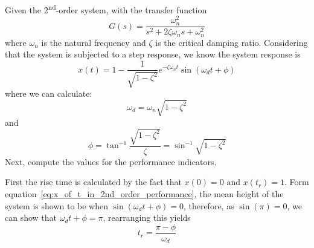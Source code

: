 \documentclass[12pt,letter]{article}
\begin{document}
Given the 2\textsuperscript{nd}-order system, with the transfer function
\begin{equation}
G(s) = \frac{\omega_n^2}{s^2 + 2 \zeta \omega_n s + \omega_n^2}
\end{equation}
where $\omega_n$ is the natural frequency and $\zeta$ is the critical damping ratio. Considering that the system is subjected to a step response, we know the system response is
\begin{equation}
x(t) = 1 - \frac{1}{\sqrt{1-\zeta^2}} e^{-\zeta \omega_n t} \sin (\omega_d t + \phi)
\label{eq:x_of_t_in_2nd_order_performance}
\end{equation}
where we can calculate:
\begin{equation}
\omega_d = \omega_n \sqrt{1-\zeta^2}
\end{equation}
and
\begin{equation}
\phi = \tan^{-1} \frac{\sqrt{1-\zeta^2}}{\zeta} = \sin^{-1} \sqrt{1-\zeta^2}
\label{eq:tan_in_performance_indicators}
\end{equation}
Next, compute the values for the performance indicators. 

First the rise time is calculated by the fact that $x(0) = 0$ and $x(t_r)=1$. Form equation~\ref{eq:x_of_t_in_2nd_order_performance}, the mean height of the system is shown to be when $ \sin (\omega_d t + \phi) = 0$, therefore, as $\sin(\pi)=0$, we can show that $\omega_d t + \phi = \pi$, rearranging this yields 
\begin{equation}
t_r = \frac{\pi - \phi}{\omega_d}
\end{equation}
\end{document}
